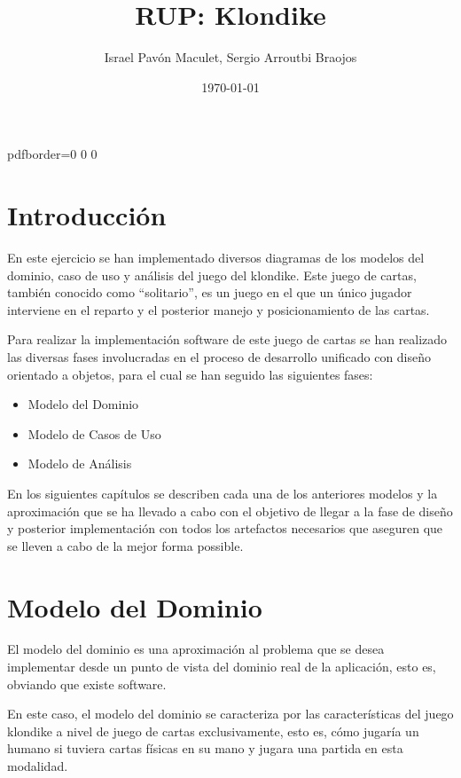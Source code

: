 \documentclass[11pt]{article}
\title{\textbf{RUP: Klondike}}
\author{Israel Pavón Maculet,
Sergio Arroutbi Braojos}
\date{\today}
\begin{document}
\hypersetup
{   
pdfborder={0 0 0}
}
   
\maketitle

\pagebreak

\tableofcontents

\pagebreak

\section{Introducción}
En este ejercicio se han implementado diversos diagramas de los modelos del dominio, caso de uso y análisis del juego del klondike. Este juego de cartas, también conocido como ``solitario'', es un juego en el que un único jugador interviene en el reparto y el posterior manejo y posicionamiento de las cartas.

Para realizar la implementación software de este juego de cartas se han realizado las diversas fases involucradas en el proceso de desarrollo unificado con diseño orientado a objetos, para el cual se han seguido las siguientes fases:

\begin{itemize}\itemsep0pt
\item{Modelo del Dominio}
\item{Modelo de Casos de Uso}
\item{Modelo de Análisis}
\end{itemize}

En los siguientes capítulos se describen cada una de los anteriores modelos y la aproximación que se ha llevado a cabo con el objetivo de llegar a la fase de diseño y posterior implementación con todos los artefactos necesarios que aseguren que se lleven a cabo de la mejor forma possible.

\pagebreak

\section{Modelo del Dominio}

El modelo del dominio es una aproximación al problema que se desea implementar desde un punto de vista del dominio real de la aplicación, esto es, obviando que existe software.

En este caso, el modelo del dominio se caracteriza por las características del juego klondike a nivel de juego de cartas exclusivamente, esto es, cómo jugaría un humano si tuviera cartas físicas en su mano y jugara una partida en esta modalidad. 
\end{document}
